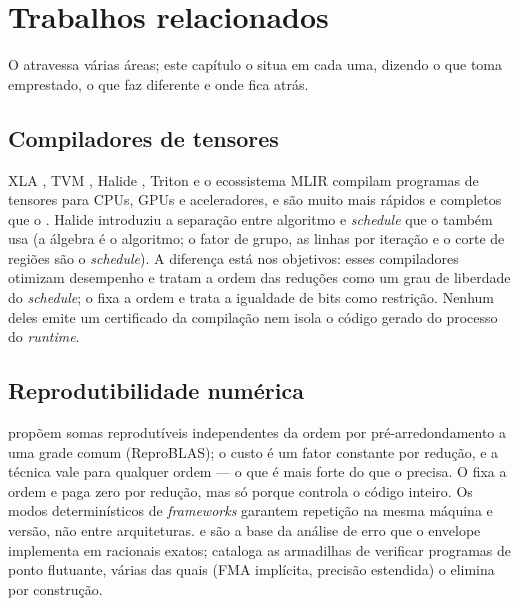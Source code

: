\chapter{Trabalhos relacionados}\label{cap:relacionados}

O \vapor{} atravessa várias áreas; este capítulo o situa em cada uma, dizendo o que toma emprestado, o que faz diferente e onde fica atrás.

\section{Compiladores de tensores}

XLA \cite{xla}, TVM \cite{chen2018tvm}, Halide \cite{ragankelley2013}, Triton \cite{tillet2019} e o ecossistema MLIR \cite{lattner2021} compilam programas de tensores para CPUs, GPUs e aceleradores, e são muito mais rápidos e completos que o \vapor{}. Halide introduziu a separação entre algoritmo e \textit{schedule} que o \vapor{} também usa (a álgebra é o algoritmo; o fator de grupo, as linhas por iteração e o corte de regiões são o \textit{schedule}). A diferença está nos objetivos: esses compiladores otimizam desempenho e tratam a ordem das reduções como um grau de liberdade do \textit{schedule}; o \vapor{} fixa a ordem e trata a igualdade de bits como restrição. Nenhum deles emite um certificado da compilação nem isola o código gerado do processo do \textit{runtime}.

\section{Reprodutibilidade numérica}

 propõem somas reprodutíveis independentes da ordem por pré-arredondamento a uma grade comum (ReproBLAS); o custo é um fator constante por redução, e a técnica vale para qualquer ordem --- o que é mais forte do que o \vapor{} precisa. O \vapor{} fixa a ordem e paga zero por redução, mas só porque controla o código inteiro. Os modos determinísticos de \textit{frameworks} \cite{pytorchdeterminism} garantem repetição na mesma máquina e versão, não entre arquiteturas.  e  são a base da análise de erro que o envelope implementa em racionais exatos;  cataloga as armadilhas de verificar programas de ponto flutuante, várias das quais (FMA implícita, precisão estendida) o \vapor{} elimina por construção.

